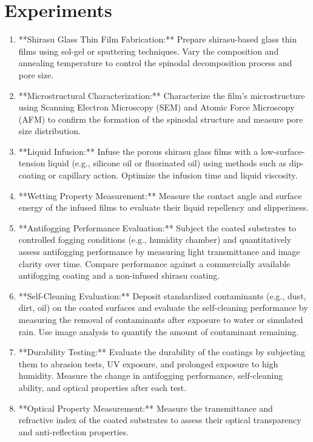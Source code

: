 \documentclass{article}
\begin{document}
\section{Experiments}
\begin{enumerate}
\item **Shirasu Glass Thin Film Fabrication:** Prepare shirasu-based glass thin films using sol-gel or sputtering techniques. Vary the composition and annealing temperature to control the spinodal decomposition process and pore size.
\item **Microstructural Characterization:** Characterize the film's microstructure using Scanning Electron Microscopy (SEM) and Atomic Force Microscopy (AFM) to confirm the formation of the spinodal structure and measure pore size distribution.
\item **Liquid Infusion:** Infuse the porous shirasu glass films with a low-surface-tension liquid (e.g., silicone oil or fluorinated oil) using methods such as dip-coating or capillary action. Optimize the infusion time and liquid viscosity.
\item **Wetting Property Measurement:** Measure the contact angle and surface energy of the infused films to evaluate their liquid repellency and slipperiness.
\item **Antifogging Performance Evaluation:** Subject the coated substrates to controlled fogging conditions (e.g., humidity chamber) and quantitatively assess antifogging performance by measuring light transmittance and image clarity over time. Compare performance against a commercially available antifogging coating and a non-infused shirasu coating.
\item **Self-Cleaning Evaluation:** Deposit standardized contaminants (e.g., dust, dirt, oil) on the coated surfaces and evaluate the self-cleaning performance by measuring the removal of contaminants after exposure to water or simulated rain. Use image analysis to quantify the amount of contaminant remaining.
\item **Durability Testing:** Evaluate the durability of the coatings by subjecting them to abrasion tests, UV exposure, and prolonged exposure to high humidity. Measure the change in antifogging performance, self-cleaning ability, and optical properties after each test.
\item **Optical Property Measurement:** Measure the transmittance and refractive index of the coated substrates to assess their optical transparency and anti-reflection properties.
\end{enumerate}
\end{document}
